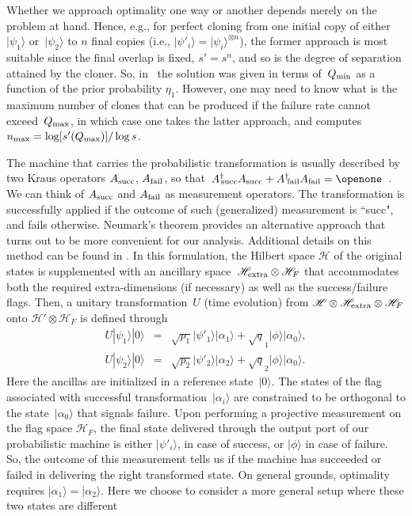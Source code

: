 \documentclass[aps,pra,twocolumn,showpacs]{revtex4-1}
\begin{document}
{Whether we approach optimality one way or another depends merely on the problem at hand. Hence, e.g., for perfect cloning from one initial copy of either $|\psi_1\rangle$ or~$|\psi_2\rangle$ to $n$ final copies (i.e., $|\psi'_i\rangle=|\psi_i\rangle^{\otimes n}$), the former approach is most suitable since the final overlap is fixed, $s'=s^n$,  and so is the degree of separation attained by the cloner. So, in~\cite{us1} the solution was given in terms of~$Q_{\rm min}$ as a function of the prior probability $\eta_1$. However, one may need to know what is the maximum number of clones that can be produced if the failure rate cannot exceed~$Q_{\rm max}$, in which case one takes the latter approach, and computes~$n_{\rm max}=\log[s'(Q_{\rm max})]/\log s$. 

The machine that carries the probabilistic transformation is usually described by two Kraus operators $A_{\rm succ}$, $A_{\rm fail}$, so that~$A^\dagger{}_{\kern-.3em\rm succ}A_{\rm succ}+A^\dagger{}_{\kern-.2em\rm fail}A_{\rm fail}=\openone$~\cite{Nielsen&Chuang,Chefles+Barnett}. We can think of $A_{\rm succ}$ and $A_{\rm fail}$ as measurement operators. The transformation is successfully applied if the outcome of such (generalized) measurement is ``succ",  and fails otherwise.
Neumark's theorem provides an alternative approach  that turns out to be more convenient for our analysis.  Additional details on this method can be found in \cite{Bergou}. 
In this formulation, 
the Hilbert space ${\mathscr H}$ of the original states is supplemented with an ancillary space~${\mathscr H}_{\rm extra}\otimes {\mathscr H}_F$ that accommodates both the required extra-dimensions (if necessary) as well as the success/failure flags. Then, a unitary transformation~$U$ (time evolution) from ${\mathscr H}\otimes {\mathscr H}_{\rm extra}\otimes {\mathscr H}_{F}$ onto ${\mathscr H}'\otimes{\mathscr H}_F$ is defined through~\cite{DuanGuo,us1,chsep}
%
\begin{eqnarray}
U|\psi_1\rangle|0\rangle&=& \sqrt{p_1}|\psi'_1\rangle|\alpha_1\rangle +\sqrt q_1 |\phi\rangle|\alpha_0\rangle,\label{U1}\\
U|\psi_2\rangle|0\rangle&=& \sqrt{p_2}|\psi'_2\rangle|\alpha_2\rangle +\sqrt q_2 |\phi\rangle|\alpha_0\rangle. \label{U2}
\end{eqnarray}
%
Here the ancillas are initialized in a reference state~$|0\rangle$. The states of the flag associated with successful transformation~$| {\alpha_i}\rangle$ are constrained to be orthogonal to the state~$|\alpha_0\rangle$ that signals failure. Upon performing a projective measurement  on the flag space ${\mathscr H}_F$, the final state delivered through the output port of our probabilistic machine is either $|\psi'_i\rangle$, in case of success, or $|\phi\rangle$ in case of failure. So, the outcome of this measurement tells us if the machine has succeeded or failed in delivering the right transformed state.  On general grounds, optimality requires $|\alpha_1\rangle=|\alpha_2\rangle$. Here we choose to consider a more general setup where these two states are different
}
\end{document}
